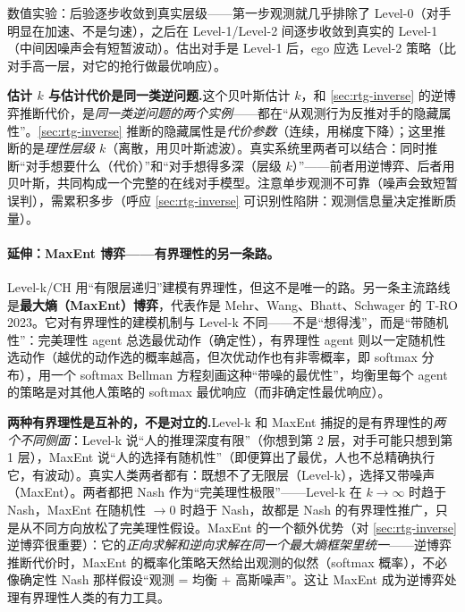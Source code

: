 \noindent 数值实验：后验逐步收敛到真实层级——第一步观测就几乎排除了 Level-0（对手明显在加速、不是匀速），之后在 Level-1/Level-2 间逐步收敛到真实的 Level-1（中间因噪声会有短暂波动）\cite{camerer2004cognitive}。估出对手是 Level-1 后，ego 应选 Level-2 策略（比对手高一层，对它的抢行做最优响应）。

\begin{insight}
\textbf{估计 $k$ 与估计代价是同一类逆问题.}\;这个贝叶斯估计 $k$，和 \cref{sec:rtg-inverse} 的逆博弈推断代价，是\emph{同一类逆问题的两个实例}——都在“从观测行为反推对手的隐藏属性”。\cref{sec:rtg-inverse} 推断的隐藏属性是\emph{代价参数}（连续，用梯度下降）；这里推断的是\emph{理性层级 $k$}（离散，用贝叶斯滤波）。真实系统里两者可以结合：同时推断“对手想要什么（代价）”和“对手想得多深（层级 $k$）”——前者用逆博弈、后者用贝叶斯，共同构成一个完整的在线对手模型。注意单步观测不可靠（噪声会致短暂误判），需累积多步（呼应 \cref{sec:rtg-inverse} 可识别性陷阱：观测信息量决定推断质量）。
\end{insight}

\paragraph{延伸：MaxEnt 博弈——有界理性的另一条路。}
Level-k/CH 用“有限层递归”建模有界理性，但这不是唯一的路。另一条主流路线是\textbf{最大熵（MaxEnt）博弈}，代表作是 Mehr、Wang、Bhatt、Schwager 的 T-RO 2023\cite{mehr2023maximum}。它对有界理性的建模机制与 Level-k 不同——不是“想得浅”，而是“带随机性”：完美理性 agent 总选最优动作（确定性），有界理性 agent 则以一定随机性选动作（越优的动作选的概率越高，但次优动作也有非零概率，即 softmax 分布），用一个 softmax Bellman 方程刻画这种“带噪的最优性”，均衡里每个 agent 的策略是对其他人策略的 softmax 最优响应（而非确定性最优响应）。

\begin{insight}
\textbf{两种有界理性是互补的，不是对立的.}\;Level-k 和 MaxEnt 捕捉的是有界理性的\emph{两个不同侧面}：Level-k 说“人的推理深度有限”（你想到第 2 层，对手可能只想到第 1 层），MaxEnt 说“人的选择有随机性”（即便算出了最优，人也不总精确执行它，有波动）。真实人类两者都有：既想不了无限层（Level-k），选择又带噪声（MaxEnt）。两者都把 Nash 作为“完美理性极限”——Level-k 在 $k\to\infty$ 时趋于 Nash，MaxEnt 在随机性 $\to0$ 时趋于 Nash，故都是 Nash 的有界理性推广，只是从不同方向放松了完美理性假设。MaxEnt 的一个额外优势（对 \cref{sec:rtg-inverse} 逆博弈很重要）：它的\emph{正向求解和逆向求解在同一个最大熵框架里统一}——逆博弈推断代价时，MaxEnt 的概率化策略天然给出观测的似然（softmax 概率），不必像确定性 Nash 那样假设“观测 = 均衡 + 高斯噪声”。这让 MaxEnt 成为逆博弈处理有界理性人类的有力工具。
\end{insight}

